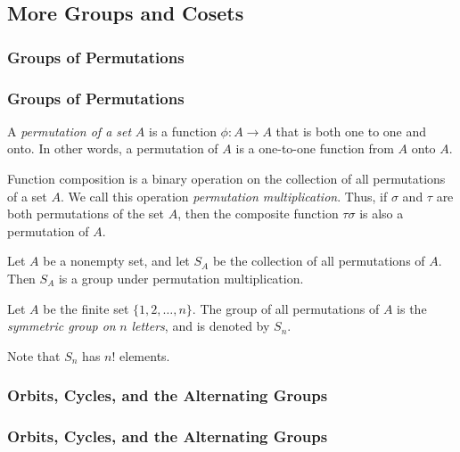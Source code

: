 \subsection{More Groups and Cosets}
{\subsubsection{Groups of Permutations}}
{\subsubsection{Groups of Permutations\protect\footnotemark}
}
\begin{definition}[Permutation]
A \emph{permutation of a set} $A$ is a function 
$\phi: A \to A$ 
that is both one to one and onto.  In other words, a permutation of
$A$ is a one-to-one function from $A$ onto $A$.
\end{definition}

Function composition is a binary operation on the collection of all
permutations of a set $A$.  We call this operation {\it permutation
multiplication}.  Thus, if $\sigma$ and $\tau$ are both permutations
of the set $A$, then the composite function $\tau \sigma$ is also a
permutation of $A$.

\begin{theorem}
Let $A$ be a nonempty set, and let $S_A$ be the collection of all
permutations of $A$.  Then $S_A$ is a group under permutation
multiplication. 
\end{theorem}

\begin{definition}
Let $A$ be the finite set $\{1, 2, \ldots,n\}$.  The group of all
permutations of $A$ is the \emph{symmetric group on} $n$
\emph{letters}, and is denoted by $S_n$.
\end{definition}
Note that $S_n$ has $n!$ elements.

{\subsubsection{Orbits, Cycles, and the Alternating Groups}}
{\subsubsection{Orbits, Cycles, and the Alternating Groups\protect\footnotemark}
}
